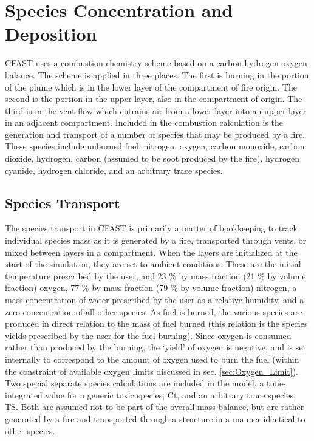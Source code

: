 \section{Species Concentration and Deposition}

CFAST uses a combustion chemistry scheme based on a carbon-hydrogen-oxygen balance.  The scheme is applied in three places.  The first is burning in the portion of the plume which is in the lower layer of the compartment of fire origin.  The second is the portion in the upper layer, also in the compartment of origin.  The third is in the vent flow which entrains air from a lower layer into an upper layer in an adjacent compartment.  Included in the combustion calculation is the generation and transport of a number of species that may be produced by a fire.  These species include unburned fuel, nitrogen, oxygen, carbon monoxide, carbon dioxide, hydrogen, carbon (assumed to be soot produced by the fire), hydrogen cyanide, hydrogen chloride, and an arbitrary trace species.

\subsection{Species Transport}

The species transport in CFAST is primarily a matter of bookkeeping to track individual species mass as it is generated by a fire, transported through vents, or mixed between layers in a compartment.  When the layers are initialized at the start of the simulation, they are set to ambient conditions.  These are the initial temperature prescribed by the user, and 23 \% by mass fraction (21 \% by volume fraction) oxygen, 77 \% by mass fraction (79 \% by volume fraction) nitrogen, a mass concentration of water prescribed by the user as a relative humidity, and a zero concentration of all other species.  As fuel is burned, the various species are produced in direct relation to the mass of fuel burned (this relation is the species yields prescribed by the user for the fuel burning).  Since oxygen is consumed rather than produced by the burning, the `yield' of oxygen is negative, and is set internally to correspond to the amount of oxygen used to burn the fuel (within the constraint of available oxygen limits discussed in sec. \ref{sec:Oxygen_Limit}). Two special separate species calculations are included in the model, a time-integrated value for a generic toxic species, Ct, and an arbitrary trace species, TS.  Both are assumed not to be part of the overall mass balance, but are rather generated by a fire and transported through a structure in a manner identical to other species.

